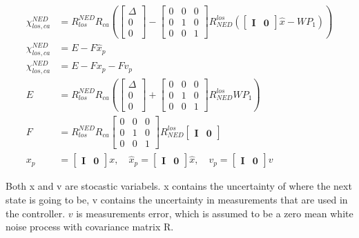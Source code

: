 \begin{align}
    \chi^{NED}_{los,ca} & = R^{NED}_{los}  R_{ca} \left(  \begin{bmatrix}\Delta \\ 0 \\ 0\end{bmatrix} - \begin{bmatrix} 0 & 0 & 0 \\ 0 & 1 & 0 \\ 0 & 0 & 1 \end{bmatrix} R^{los}_{NED} (\begin{bmatrix} \mathbf{I} & \mathbf{0} \end{bmatrix} \hat{x} - WP_1) \right) \\
    \chi^{NED}_{los,ca} & = E - F \hat{x}_p \\
    \chi^{NED}_{los,ca} & = E - F x_p - F v_p \\
    E & = R^{NED}_{los}  R_{ca} \left(  \begin{bmatrix}\Delta \\ 0 \\ 0\end{bmatrix} + \begin{bmatrix} 0 & 0 & 0 \\ 0 & 1 & 0 \\ 0 & 0 & 1 \end{bmatrix} R^{los}_{NED} WP_1 \right) \\
    F & = R^{NED}_{los}  R_{ca}  \begin{bmatrix} 0 & 0 & 0 \\ 0 & 1 & 0 \\ 0 & 0 & 1 \end{bmatrix} R^{los}_{NED}  \begin{bmatrix} \mathbf{I} & \mathbf{0} \end{bmatrix} \\
    x_p & = \begin{bmatrix}\mathbf{I}  &\mathbf{0}\end{bmatrix} x, \quad 
    \hat{x}_p  = \begin{bmatrix}\mathbf{I}& \mathbf{0}\end{bmatrix} \hat{x}, \quad
    v_p  = \begin{bmatrix}\mathbf{I}& \mathbf{0}\end{bmatrix} v 
\end{align}

Both x and v are stocastic variabels. x contains the uncertainty of where the next state is going to be, v contains the uncertainty in measurements that are used in the controller. $v$ is measurements error, which is assumed to be a zero mean white noise process with covariance matrix R.

